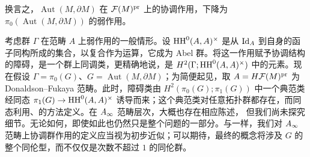换言之，$\operatorname{Aut}(M,\partial M)$ 在 $\mathcal F(M)^{\mathrm{pr}}$ 上的协调作用，下降为 $\pi_0(\operatorname{Aut}(M,\partial M))$ 的弱作用。
\begin{note}\label{st:10.4}
考虑群 $\Gamma$ 在范畴 $A$ 上弱作用的一般情形。设 $\operatorname{HH}^0(A,A)^\times$ 是从 $\operatorname{Id}_A$ 到自身的函子同构所成的集合，以复合作为运算，它成为 Abel 群。将这一作用赋予协调结构的障碍，是一个群上同调类，更精确地说，是 $H^2(\Gamma;\operatorname{HH}^0(A,A)^\times)$ 中的元素。现在假设 $\Gamma=\pi_0(G)$、$G=\operatorname{Aut}(M,\partial M)$；为简便起见，取 $A=H\mathcal F(M)^{\mathrm{pr}}$ 为 Donaldson–Fukaya 范畴。此时，障碍类由 $H^2(\pi_0(G);\pi_1(G))$ 中一个典范类经同态 $\pi_1(G)\to\operatorname{HH}^0(A,A)^\times$ 诱导而来；这个典范类对任意拓扑群都存在，而同态利用、的方法定义。在 $A_\infty$ 范畴层次，大概也存在相应陈述，
但我们尚未探究细节。无论如何，即使如此也仍然只是整个问题的一部分。与一样，我们对 $A_\infty$ 范畴上协调群作用的定义应当视为初步近似；可以期待，最终的概念将涉及 $G$ 的整个同伦型，而不仅仅是次数不超过 $1$ 的同伦群。
\end{note}

